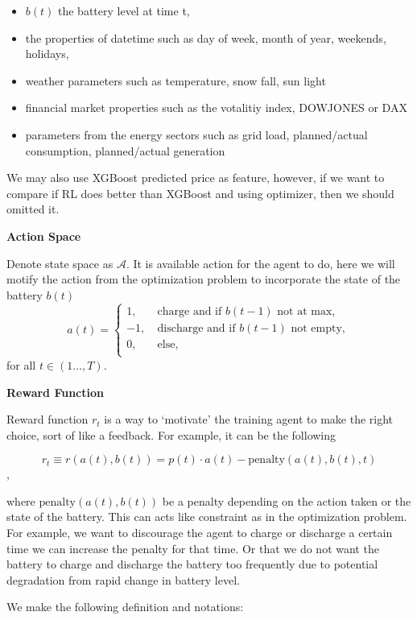 \documentclass[11pt]{article}
\providecommand{\tightlist}{%
      \setlength{\itemsep}{0pt}\setlength{\parskip}{0pt}}
\begin{document}
\begin{itemize}
\tightlist
\item
  \(b(t)\) the battery level at time t,
\item
  the properties of datetime such as day of week, month of year,
  weekends, holidays,
\item
  weather parameters such as temperature, snow fall, sun light
\item
  financial market properties such as the votalitiy index, DOWJONES or
  DAX
\item
  parameters from the energy sectors such as grid load, planned/actual
  consumption, planned/actual generation
\end{itemize}

We may also use XGBoost predicted price as feature, however, if we want
to compare if RL does better than XGBoost and using optimizer, then we
should omitted it.

{\textbf{Action Space}}

Denote state space as \(\mathcal{A}\). It is available action for the
agent to do, here we will motify the action from the optimization
problem to incorporate the state of the battery \(b(t)\) \[
a(t) =
\begin{cases}
1,\quad & \text{charge and if } b(t-1) \text{ not at max},\\
-1, & \text{discharge and if } b(t-1) \text{ not empty},\\
0, & \text{else},\\
\end{cases}
\] for all \(t \in (1\dots,T)\).

{\textbf{Reward Function}}

Reward function \(r_t\) is a way to `motivate' the training agent to
make the right choice, sort of like a feedback. For example, it can be
the following

\[
r_t \equiv r (a(t), b(t)) = p(t) \cdot a(t) - \text{penalty} (a(t), b(t), t)
\],

where \(\text{penalty}(a(t), b(t))\) be a penalty depending on the
action taken or the state of the battery. This can acts like constraint
as in the optimization problem. For example, we want to discourage the
agent to charge or discharge a certain time we can increase the penalty
for that time. Or that we do not want the battery to charge and
discharge the battery too frequently due to potential degradation from
rapid change in battery level.

    We make the following definition and notations:
\end{document}
